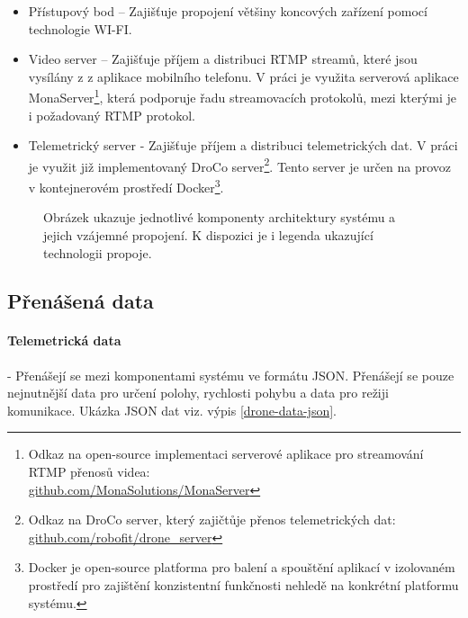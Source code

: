 \begin{itemize}
    \item Přístupový bod -- Zajišťuje propojení většiny koncových zařízení pomocí technologie WI-FI.
    
    \item Video server -- Zajišťuje příjem a distribuci RTMP streamů, které jsou vysílány z z aplikace mobilního telefonu. V práci je využita serverová aplikace MonaServer\footnote{Odkaz na open-source implementaci serverové aplikace pro streamování RTMP přenosů videa: \\ \href{https://github.com/MonaSolutions/MonaServer}{github.com/MonaSolutions/MonaServer}}, která podporuje řadu streamovacích protokolů, mezi kterými je i požadovaný RTMP protokol.
   
    \item Telemetrický server - Zajišťuje příjem a distribuci telemetrických dat. V práci je využit již implementovaný DroCo server\footnote{Odkaz na DroCo server, který zajičtůje přenos telemetrických dat: \href{https://github.com/robofit/drone_server}{github.com/robofit/drone\_server}}. Tento server je určen na provoz v kontejnerovém prostředí Docker\footnote{Docker je open-source platforma pro balení a  spouštění aplikací v izolovaném prostředí pro zajištění konzistentní funkčnosti nehledě na konkrétní platformu systému.}.
\end{itemize}

\begin{figure}[ht]
    \centering
    
    \caption{Obrázek ukazuje jednotlivé komponenty architektury systému  a  jejich vzájemné propojení. K dispozici je i legenda ukazující technologii  propoje. }
    \label{pic:ekosystem}
\end{figure}

\subsection{Přenášená data}

\paragraph{Telemetrická data} - Přenášejí se mezi komponentami systému ve formátu JSON. Přenášejí se pouze nejnutnější data pro určení polohy, rychlosti pohybu a data pro režiji komunikace. Ukázka JSON dat viz. výpis \ref{drone-data-json}.
